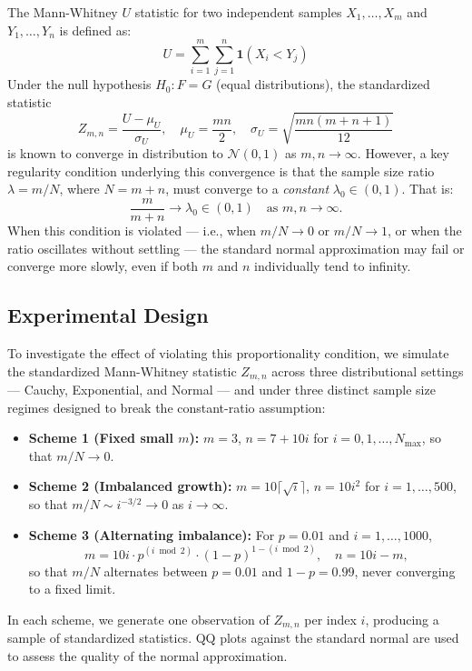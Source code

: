 \documentclass[10pt]{article}
\begin{document}
The Mann-Whitney $U$ statistic for two independent samples $X_1, \ldots, X_m$ and $Y_1, \ldots, Y_n$ is defined as:
\[
U = \sum_{i=1}^{m} \sum_{j=1}^{n} \mathbf{1}(X_i < Y_j)
\]
Under the null hypothesis $H_0: F = G$ (equal distributions), the standardized statistic
\[
Z_{m,n} = \frac{U - \mu_U}{\sigma_U}, \quad \mu_U = \frac{mn}{2}, \quad \sigma_U = \sqrt{\frac{mn(m+n+1)}{12}}
\]
is known to converge in distribution to $\mathcal{N}(0,1)$ as $m, n \to \infty$. However, a key regularity condition underlying this convergence is that the sample size ratio $\lambda = m/N$, where $N = m + n$, must converge to a \emph{constant} $\lambda_0 \in (0,1)$. That is:
\[
\frac{m}{m+n} \to \lambda_0 \in (0,1) \quad \text{as } m, n \to \infty.
\]
When this condition is violated --- i.e., when $m/N \to 0$ or $m/N \to 1$, or when the ratio oscillates without settling --- the standard normal approximation may fail or converge more slowly, even if both $m$ and $n$ individually tend to infinity.

\subsection{Experimental Design}

To investigate the effect of violating this proportionality condition, we simulate the standardized Mann-Whitney statistic $Z_{m,n}$ across three distributional settings --- Cauchy, Exponential, and Normal --- and under three distinct sample size regimes designed to break the constant-ratio assumption:

\begin{itemize}
    \item \textbf{Scheme 1 (Fixed small $m$):} $m = 3$, $n = 7 + 10i$ for $i = 0, 1, \ldots, N_{\max}$, so that $m/N \to 0$.
    \item \textbf{Scheme 2 (Imbalanced growth):} $m = 10\lceil\sqrt{i}\rceil$, $n = 10i^2$ for $i = 1, \ldots, 500$, so that $m/N \sim i^{-3/2} \to 0$ as $i \to \infty$.
    \item \textbf{Scheme 3 (Alternating imbalance):} For $p = 0.01$ and $i = 1, \ldots, 1000$,
    \[
    m = 10i \cdot p^{(i \bmod 2)} \cdot (1-p)^{1-(i \bmod 2)}, \quad n = 10i - m,
    \]
    so that $m/N$ alternates between $p = 0.01$ and $1-p = 0.99$, never converging to a fixed limit.
\end{itemize}

In each scheme, we generate one observation of $Z_{m,n}$ per index $i$, producing a sample of standardized statistics. QQ plots against the standard normal are used to assess the quality of the normal approximation.
\end{document}
